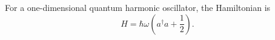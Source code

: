 \documentclass{article}
\begin{document}
For a one-dimensional quantum harmonic oscillator, the Hamiltonian is
\[
H=\hbar\omega\left(a^\dagger a+\frac12\right).
\]
\end{document}
